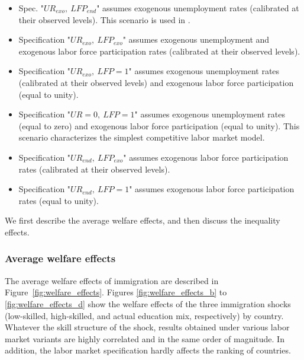 \documentclass[a4paper,12pt]{article}
\begin{document}
\begin{itemize}
\item Spec. "$UR_{exo},~LFP_{end}$" assumes exogenous unemployment rates (calibrated at their observed levels). This scenario is used in \citet{Burzynski2018}.

\item Specification "$UR_{exo},~LFP_{exo}$" assumes exogenous unemployment and exogenous labor force participation rates (calibrated at their observed levels).

\item Specification "$UR_{exo},~LFP=1$" assumes exogenous unemployment rates (calibrated at their observed levels) and exogenous labor force
participation (equal to unity).

\item Specification "$UR=0,~LFP=1$" assumes exogenous unemployment rates (equal to zero) and exogenous labor force participation (equal to unity). This scenario characterizes the simplest competitive labor market model.

\item Specification "$UR_{end},~LFP_{exo}$" assumes exogenous labor force participation rates (calibrated at their observed levels).

\item Specification "$UR_{end},~LFP=1$" assumes exogenous labor force participation rates (equal to unity). %
\end{itemize}

We first describe the average welfare effects, and then discuss the inequality effects.

\subsubsection{Average welfare effects}
The average welfare effects of immigration are described in Figure~\ref{fig:welfare_effects}. Figures \ref{fig:welfare_effects_b} to \ref{fig:welfare_effects_d} show the welfare effects of the three immigration shocks (low-skilled, high-skilled, and actual education mix, respectively) by country. Whatever the skill structure of the shock, results obtained under various labor market variants are highly correlated and in the same order of magnitude. In addition, the labor market specification hardly affects the ranking of countries. 
\end{document}
